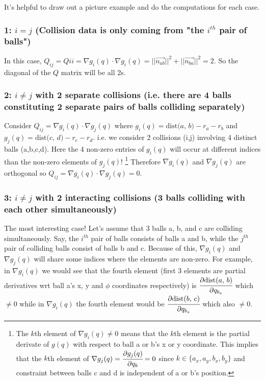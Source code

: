 \documentclass[12pt]{article}
\newcommand{\pd}[2]{\cfrac{\partial{#1}}{\partial{#2}}}
\newcommand{\dist}[2]{\text{dist(} #1 \text{, } #2 \text{)}}
\begin{document}
It's helpful to draw out a picture example and do the computations for each case.

\subsubsection*{1: $i = j$ (Collision data is only coming from "the $i^{th}$ pair of balls")} 

In this case, $Q_{ij} = Q{ii} = \nabla g_i(q) \cdot \nabla g_i(q) = ||\vec{n_{ab}}||^2 + ||\vec{n_{ba}}||^2 = 2$.
So the diagonal of the $Q$ matrix will be all 2s.

\subsubsection*{2: $i \neq j$ with 2 separate collisions (i.e. there are 4 balls constituting 2 separate pairs of balls colliding separately)}

Consider $Q_{ij} = \nabla g_i(q) \cdot \nabla g_j(q)$
where $g_i(q) = \dist{a}{b} - r_a - r_b$ and $g_j(q) = \dist{c}{d} - r_c - r_d$. 
i.e. we consider 2 collisions (i,j) involving 4 distinct balls (a,b,c,d).
Here the 4 non-zero entries of
$g_i(q)$ will occur at different indices than the non-zero elements of $g_j(q)$!
\footnote{
    The $k$th element of $\nabla g_i(q) \neq 0$ means that the $k$th element
    is the partial derivate of $g(q)$ with respect to ball a or b's x or y coordinate.
    This implies that the $k$th element
    of $\nabla g_j(q) = \pd{g_j(q)}{q_k} = 0$ since $k \in \{a_x, a_y, b_x, b_y\}$ and constraint between balls c and d is independent
    of a or b's position.
}
Therefore $\nabla g_i(q)$ and $\nabla g_j(q)$ are orthogonal so $Q_{ij} = \nabla g_i(q) \cdot \nabla g_j(q) = 0$.

\subsubsection*{3: $i \neq j$ with 2 interacting collisions (3 balls colliding with each other simultaneously)}

The most interesting case! Let's assume that 3 balls a, b, and c are colliding simultaneously.
Say, the $i^{th}$ pair of balls consists of balls a and b, while the $j^{th}$ pair of colliding
balls consist of balls b and c. Because of this, $\nabla g_i(q)$ and $\nabla g_j(q)$ will share some
indices where the elements are non-zero. For example, in $\nabla g_i(q)$ we would see that the fourth element
(first 3 elements are partial derivatives wrt ball a's x, y and $\phi$ coordinates respectively)
is $\pd{\dist{a}{b}}{q_{b_x}}$ which $\neq 0$ while in $\nabla g_i(q)$ the fourth element would be
$\pd{\dist{b}{c}}{q_{b_x}}$ which also $\neq 0$.\\
\end{document}
